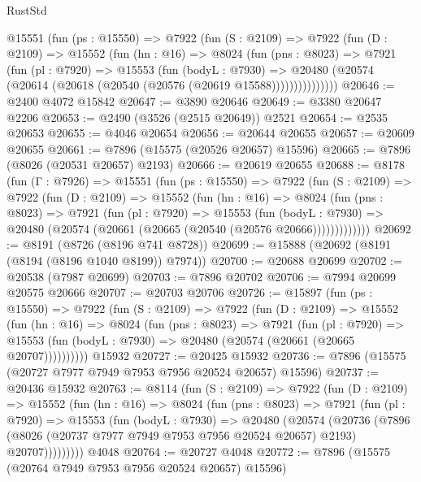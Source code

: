\begin{lexlean}{RustStd}
\begin{coremodule}
      @15551
        (fun (ps : @15550) =>
        @7922
          (fun (S : @2109) =>
          @7922
            (fun (D : @2109) =>
            @15552
              (fun (hn : @16) =>
              @8024
                (fun (pns : @8023) =>
                @7921
                  (fun (pl : @7920) =>
                  @15553
                    (fun (bodyL : @7930) =>
                    @20480 (@20574 (@20614 (@20618 (@20540 (@20576 (@20619 @15588)))))))))))))))
@20646 := @2400 @4072 @15842
@20647 := @3890 @20646
@20649 := @3380 @20647 @2206
@20653 := @2490 (@3526 (@2515 @20649)) @2521
@20654 := @2535 @20653
@20655 := @4046 @20654
@20656 := @20644 @20655
@20657 := @20609 @20655
@20661 := @7896 (@15575 (@20526 @20657) @15596)
@20665 := @7896 (@8026 (@20531 @20657) @2193)
@20666 := @20619 @20655
@20688 := @8178
    (fun (Γ : @7926) =>
    @15551
      (fun (ps : @15550) =>
      @7922
        (fun (S : @2109) =>
        @7922
          (fun (D : @2109) =>
          @15552
            (fun (hn : @16) =>
            @8024
              (fun (pns : @8023) =>
              @7921
                (fun (pl : @7920) =>
                @15553
                  (fun (bodyL : @7930) =>
                  @20480 (@20574 (@20661 (@20665 (@20540 (@20576 @20666)))))))))))))
@20692 := @8191 (@8726 (@8196 @741 @8728))
@20699 := @15888 (@20692 (@8191 (@8194 (@8196 @1040 @8199)) @7974))
@20700 := @20688 @20699
@20702 := @20538 (@7987 @20699)
@20703 := @7896 @20702
@20706 := @7994 @20699 @20575 @20666
@20707 := @20703 @20706
@20726 := @15897
    (fun (ps : @15550) =>
    @7922
      (fun (S : @2109) =>
      @7922
        (fun (D : @2109) =>
        @15552
          (fun (hn : @16) =>
          @8024
            (fun (pns : @8023) =>
            @7921
              (fun (pl : @7920) =>
              @15553 (fun (bodyL : @7930) => @20480 (@20574 (@20661 (@20665 @20707))))))))))
    @15932
@20727 := @20425 @15932
@20736 := @7896 (@15575 (@20727 @7977 @7949 @7953 @7956 @20524 @20657) @15596)
@20737 := @20436 @15932
@20763 := @8114
    (fun (S : @2109) =>
    @7922
      (fun (D : @2109) =>
      @15552
        (fun (hn : @16) =>
        @8024
          (fun (pns : @8023) =>
          @7921
            (fun (pl : @7920) =>
            @15553
              (fun (bodyL : @7930) =>
              @20480
                (@20574
                  (@20736
                    (@7896
                      (@8026 (@20737 @7977 @7949 @7953 @7956 @20524 @20657) @2193)
                      @20707)))))))))
    @4048
@20764 := @20727 @4048
@20772 := @7896 (@15575 (@20764 @7949 @7953 @7956 @20524 @20657) @15596)

\end{coremodule}
\end{lexlean}
